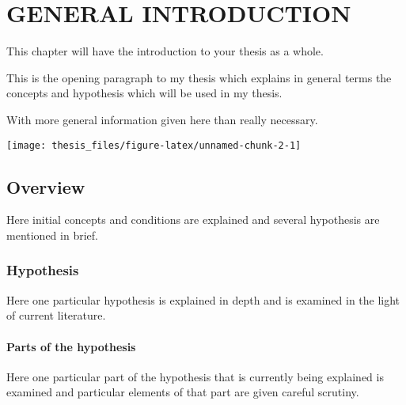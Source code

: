 \documentclass[
  12pt,
  notitlepage]{isuthesis}
\begin{document}



\chapter{GENERAL INTRODUCTION}

\label{general_fibers}

This chapter will have the introduction to your thesis as a whole.

This is the opening paragraph to my thesis which
explains in general terms the concepts and hypothesis
which will be used in my thesis.

With more general information given here than really
necessary.

\begin{center}\texttt{[image: thesis\_files/figure-latex/unnamed-chunk-2-1]} \end{center}

\section{Overview}

Here initial concepts and conditions are explained and
several hypothesis are mentioned in brief.

\subsection{Hypothesis}

Here one particular hypothesis is explained in depth
and is examined in the light of current literature.

\subsubsection{Parts of the hypothesis}

Here one particular part of the hypothesis that is
currently being explained is examined and particular
elements of that part are given careful scrutiny.
\end{document}
